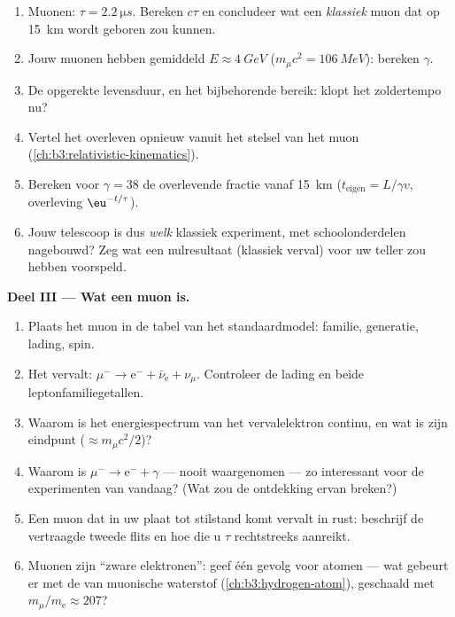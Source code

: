 \begin{problem}
\begin{enumerate}[resume]
  \item Muonen: $\tau = \qty{2.2}{\micro s}$. Bereken $c\tau$ en
        concludeer wat een \emph{klassiek} muon dat op
        \qty{15}{km} wordt geboren zou kunnen.
  \item Jouw muonen hebben gemiddeld $E \approx \qty{4}{GeV}$
        ($m_\mu c^2 = \qty{106}{MeV}$): bereken $\gamma$.
  \item De opgerekte levensduur, en het bijbehorende bereik: klopt het
        zoldertempo nu?
  \item Vertel het overleven opnieuw vanuit het stelsel van het muon
        (\cref{ch:b3:relativistic-kinematics}).
  \item Bereken voor $\gamma = 38$ de overlevende fractie vanaf
        \qty{15}{km} ($t_{\text{eigen}} = L/\gamma v$, overleving
        $\eu^{-t/\tau}$).
  \item Jouw telescoop is dus \emph{welk} klassiek
        experiment, met schoolonderdelen nagebouwd? Zeg wat een nul\-resultaat
        (klassiek verval) voor uw teller zou hebben voorspeld.
\end{enumerate}

\medskip\noindent\textbf{Deel III --- Wat een muon is.}

\begin{enumerate}[resume]
  \item Plaats het muon in de tabel van het standaardmodel: familie,
        generatie, lading, spin.
  \item Het vervalt: $\mu^- \to \text{e}^- + \bar\nu_{\text{e}} +
        \nu_\mu$. Controleer de lading en beide leptonfamiliegetallen.
  \item Waarom is het energiespectrum van het vervalelektron continu,
        en wat is zijn eindpunt ($\approx m_\mu c^2/2$)?
  \item Waarom is $\mu^- \to \text{e}^- + \gamma$ --- nooit
        waargenomen --- zo interessant voor de experimenten van vandaag?
        (Wat zou de ontdekking ervan breken?)
  \item Een muon dat in uw plaat tot stilstand komt vervalt in rust: beschrijf
        de vertraagde tweede flits en hoe die u $\tau$
        rechtstreeks aanreikt.
  \item Muonen zijn ``zware elektronen'': geef één gevolg voor
        atomen --- wat gebeurt er met de  van muonische
        waterstof (\cref{ch:b3:hydrogen-atom}), geschaald met
        $m_\mu/m_{\text{e}} \approx 207$?
\end{enumerate}


\end{problem}
